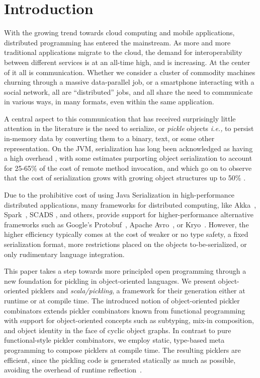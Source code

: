 \documentclass[preprint,10pt]{sigplanconf}
\theoremstyle{definition}
\theoremstyle{definition}
\begin{document}
\section{Introduction}

With the growing trend towards cloud computing and mobile applications,
distributed programming has entered the mainstream. As more and more
traditional applications migrate to the cloud, the demand for interoperability between
different services is at an all-time high, and is increasing. At the center of
it all is communication. Whether we consider a cluster of commodity machines
churning through a massive data-parallel job, or a smartphone interacting with
a social network, all are ``distributed'' jobs, and all share the need to
communicate in various ways, in many formats, even within the same
application.

A central aspect to this communication that has received surprisingly little
attention in the literature is the need to serialize, or {\em pickle} objects
{\em i.e.,} to persist in-memory data by converting them to a binary, text, or
some other representation. On the JVM, serialization has long been
acknowledged as having a high overhead \cite{Welsh2000, Carpenter1999}, with
some estimates purporting object serialization to account for 25-65\% of the
cost of remote method invocation, and which go on to observe that the cost of
serialization grows with growing object structures up to 50\%
\cite{Philippsen2000, Maassen1999}.

Due to the prohibitive cost of using Java Serialization in high-performance
distributed applications, many frameworks for distributed computing, like
Akka~\cite{Akka}, Spark~\cite{Zaharia2012}, SCADS \cite{Armbrust2009}, and
others, provide support for higher-performance alternative frameworks such as
Google's Protobuf~\cite{Protobuf}, Apache Avro~\cite{Avro}, or
Kryo~\cite{Kryo}. However, the higher efficiency typically comes at the cost
of weaker or no type safety, a fixed serialization format, more restrictions
placed on the objects to-be-serialized, or only rudimentary language
integration.

This paper takes a step towards more principled open programming through a new
foundation for pickling in object-oriented languages. We present object-oriented
picklers and \textit{scala/pickling}, a framework for their generation either at runtime or at
compile time. The introduced notion of object-oriented pickler combinators
extends pickler combinators known from functional
programming~\cite{Kennedy2004} with support for object-oriented concepts such
as subtyping, mix-in composition,  and object identity in the face of cyclic
object graphs. In contrast to pure functional-style
pickler combinators, we employ static, type-based meta programming to compose
picklers at compile time. The resulting picklers are efficient, since the
pickling code is generated statically as much as possible, avoiding the
overhead of runtime reflection~\cite{Gil2008,Dubochet2011}.
\end{document}

